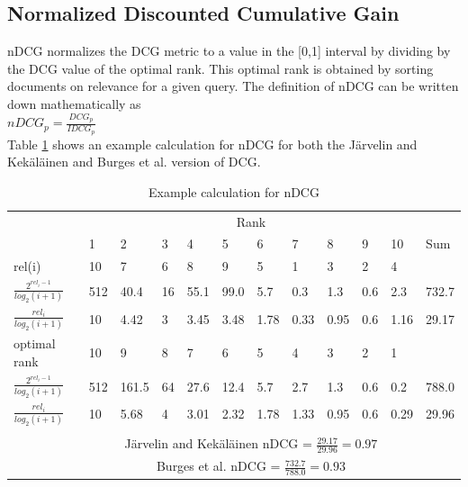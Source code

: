 \subsection{Normalized Discounted Cumulative Gain}
\ac{nDCG} normalizes the \ac{DCG} metric to a value in the [0,1] interval by dividing by the \ac{DCG} value of the optimal rank. This optimal rank is obtained by sorting documents on relevance for a given query. The definition of \ac{nDCG} can be written down mathematically as\\

$nDCG_p = \frac{DCG_p}{IDCG_p}$\\

Table \ref{tab:example_calculation_nDCG} shows an example calculation for \ac{nDCG} for both the J{\"a}rvelin and Kek{\"a}l{\"a}inen \cite{Jarvelin2002} and Burges et al. \cite{Burges2005} version of \ac{DCG}.

\begin{table}[!h]
\begin{tabular}{llllllllllll}
 & \multicolumn{10}{c}{Rank} &  \\ 
\cline{2-11}
 & 1 & 2 & 3 & 4 & 5 & 6 & 7 & 8 & 9 & 10 & Sum \\ 
\hline
\hline
rel(i) & 10 & 7 & 6 & 8 & 9 & 5 & 1 & 3 & 2 & 4 &  \\
\hline
$\frac{2^{rel_i-1}}{log_2(i+1)}$ & 512 & 40.4 & 16 & 55.1 & 99.0 & 5.7 & 0.3 & 1.3 & 0.6 & 2.3 & 732.7 \\
\hline
$\frac{rel_i}{log_2(i+1)}$ & 10 & 4.42 & 3 & 3.45 & 3.48 & 1.78 & 0.33 & 0.95 & 0.6 & 1.16 & 29.17 \\  
\hline
\hline
optimal rank & 10 & 9 & 8 & 7 & 6 & 5 & 4 & 3 & 2 & 1 &  \\
\hline 
$\frac{2^{rel_i-1}}{log_2(i+1)}$ & 512 & 161.5 & 64 & 27.6 & 12.4 & 5.7 & 2.7 & 1.3 & 0.6 & 0.2 & 788.0 \\
\hline
$\frac{rel_i}{log_2(i+1)}$ & 10 & 5.68 & 4 & 3.01 & 2.32 & 1.78 & 1.33 & 0.95 & 0.6 & 0.29 & 29.96 \\   
\hline
 &  &  &  &  &  &  &  &  &  &  &  \\
 & \multicolumn{10}{c}{J{\"a}rvelin and Kek{\"a}l{\"a}inen \cite{Jarvelin2002} \ac{nDCG} = $\frac{29.17}{29.96} = 0.97$} &  \\  
 & \multicolumn{10}{c}{Burges \cite{Burges2005} et al. \ac{nDCG} = $\frac{732.7}{788.0} = 0.93$} &  \\ 
\end{tabular}
\caption{Example calculation for \ac{nDCG}}
\label{tab:example_calculation_nDCG}
\end{table}
